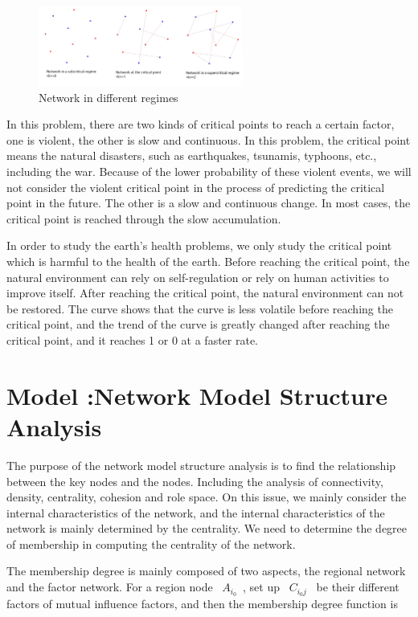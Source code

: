 \documentclass[a4paper,11pt]{article}
\begin{document}
\begin{figure}[h]%
    \centering %
    \includegraphics[width=0.6\textwidth]{./Pic/Network_in_different_regimes.png}
    \caption{Network in different regimes} 
    \label{fig:Network_in_different_regimes}  
    \end{figure}

\par In this problem, there are two kinds of critical points to reach a certain factor, one is violent, the other is slow and continuous. In this problem, the critical point means the natural disasters, such as earthquakes, tsunamis, typhoons, etc., including the war. Because of the lower probability of these violent events, we will not consider the violent critical point in the process of predicting the critical point in the future. The other is a slow and continuous change. In most cases, the critical point is reached through the slow accumulation.
\par In order to study the earth's health problems, we only study the critical point which is harmful to the health of the earth. Before reaching the critical point, the natural environment can rely on self-regulation or rely on human activities to improve itself. After reaching the critical point, the natural environment can not be restored. The curve shows that the curve is less volatile before reaching the critical point, and the trend of the curve is greatly changed after reaching the critical point, and it reaches 1 or 0 at a faster rate.

\section{Model \uppercase\expandafter{}:Network Model Structure Analysis}
\par The purpose of the network model structure analysis is to find the relationship between the key nodes and the nodes. Including the analysis of connectivity, density, centrality, cohesion and role space. On this issue, we mainly consider the internal characteristics of the network, and the internal characteristics of the network is mainly determined by the centrality. We need to determine the degree of membership in computing the centrality of the network.
\par The membership degree is mainly composed of two aspects, the regional network and the factor network. For a region node ~$A_{i_0}$~, set up ~$C_{i_{0}j}$~ be their different factors of mutual influence factors, and then the membership degree function is 
\end{document}

